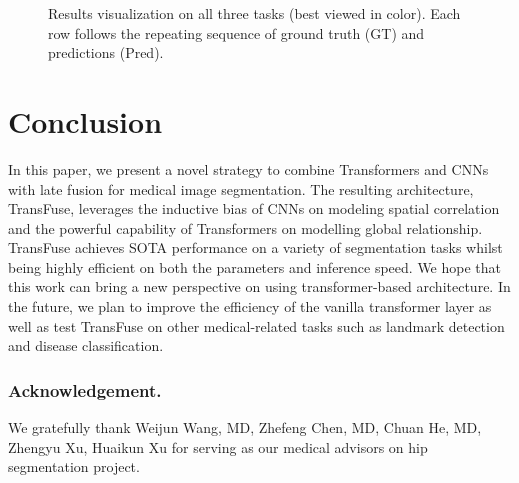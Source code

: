 \documentclass[runningheads]{llncs}
\begin{document}
\begin{figure}[!h]
\begin{center}
\caption{Results visualization on all three tasks (best viewed in color). Each row follows the repeating sequence of ground truth (GT) and predictions (Pred).}
\label{fig:visResults}
\end{center}
\end{figure}
 
\section{Conclusion}
In this paper, we present a novel strategy to combine Transformers and CNNs with late fusion for medical image segmentation. The resulting architecture, TransFuse, leverages the inductive bias of CNNs on modeling spatial correlation and the powerful capability of Transformers on modelling global relationship. TransFuse achieves SOTA performance on a variety of segmentation tasks whilst being highly efficient on both the parameters and inference speed. We hope that this work can bring a new perspective on using transformer-based architecture. In the future, we plan to improve the efficiency of the vanilla transformer layer as well as test TransFuse on other medical-related tasks such as landmark detection and disease classification.

\subsubsection{Acknowledgement.} We gratefully thank Weijun Wang, MD, Zhefeng Chen, MD, Chuan He, MD, Zhengyu Xu, Huaikun Xu for serving as our medical advisors on hip segmentation project. 

% 



\end{document}
